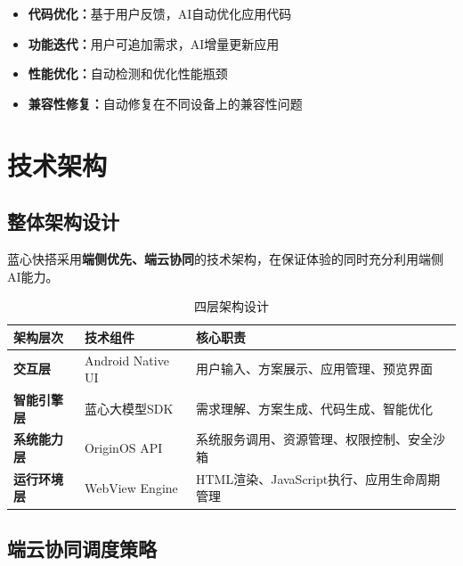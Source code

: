 \documentclass[a4paper,12pt]{ctexart}
\newcommand{\highlight}[1]{\textcolor{vivoblue}{\textbf{#1}}}
\begin{document}
\begin{itemize}[leftmargin=2em]
    \item \textbf{代码优化：}基于用户反馈，AI自动优化应用代码
    \item \textbf{功能迭代：}用户可追加需求，AI增量更新应用
    \item \textbf{性能优化：}自动检测和优化性能瓶颈
    \item \textbf{兼容性修复：}自动修复在不同设备上的兼容性问题
\end{itemize}

\section{技术架构}

\subsection{整体架构设计}

蓝心快搭采用\highlight{端侧优先、端云协同}的技术架构，在保证体验的同时充分利用端侧AI能力。

\begin{table}[H]
    \centering
    \caption{四层架构设计}
    \begin{tabularx}{\textwidth}{|l|l|X|}
        \hline
        \textbf{架构层次} & \textbf{技术组件} & \textbf{核心职责} \\
        \hline
        \highlight{交互层} & Android Native UI & 用户输入、方案展示、应用管理、预览界面 \\
        \hline
        \highlight{智能引擎层} & 蓝心大模型SDK & 需求理解、方案生成、代码生成、智能优化 \\
        \hline
        \highlight{系统能力层} & OriginOS API & 系统服务调用、资源管理、权限控制、安全沙箱 \\
        \hline
        \highlight{运行环境层} & WebView Engine & HTML渲染、JavaScript执行、应用生命周期管理 \\
        \hline
    \end{tabularx}
\end{table}

\subsection{端云协同调度策略}
\end{document}
